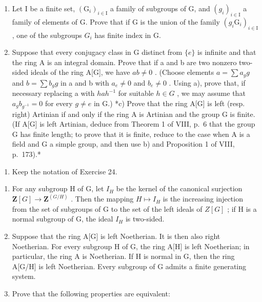 \begin{enumerate}
\def\labelenumi{\alph{enumi})}
\item
  Let I be a finite set, \((\mathrm{G}_{i})_{i\in\mathrm{I}}\) a family of subgroups of G, and \((g_{i})_{i\in\mathrm{I}}\) a family of elements of G. Prove that if G is the union of the family \((g_{i}\mathrm{G}_{i})_{i\in\mathrm{I}}\) , one of the subgroups \(G_{i}\) has finite index in G.
\item
  Suppose that every conjugacy class in G distinct from \(\{e\}\) is infinite and that the ring A is an integral domain. Prove that if a and b are two nonzero two-sided ideals of the ring A{[}G{]}, we have \(ab \neq 0\) . (Choose elements \(a = \sum a_g g\) and \(b = \sum b_g g\) in a and b with \(a_e \neq 0\) and \(b_e \neq 0\) . Using a), prove that, if necessary replacing a with \(hah^{-1}\) for suitable \(h \in G\) , we may assume that \(a_g b_{g^{-1}} = 0\) for every \(g \neq e\) in G.) *c) Prove that the ring A{[}G{]} is left (resp. right) Artinian if and only if the ring A is Artinian and the group G is finite. (If A{[}G{]} is left Artinian, deduce from Theorem 1 of VIII, p.~6 that the group G has finite length; to prove that it is finite, reduce to the case when A is a field and G a simple group, and then use b) and Proposition 1 of VIII, p.~173).*
\end{enumerate}

\begin{enumerate}
\def\labelenumi{\arabic{enumi})}
\setcounter{enumi}{24}
\tightlist
\item
  Keep the notation of Exercise 24.
\end{enumerate}

\begin{enumerate}
\def\labelenumi{\alph{enumi})}
\item
  For any subgroup H of G, let \(I_{H}\) be the kernel of the canonical surjection \(\mathbf{Z}[G] \to \mathbf{Z}^{(G/H)}\) . Then the mapping \(H \mapsto I_{H}\) is the increasing injection from the set of subgroups of G to the set of the left ideals of \(Z[G]\) ; if H is a normal subgroup of G, the ideal \(I_{H}\) is two-sided.
\item
  Suppose that the ring A{[}G{]} is left Noetherian. It is then also right Noetherian. For every subgroup H of G, the ring A{[}H{]} is left Noetherian; in particular, the ring A is Noetherian. If H is normal in G, then the ring A{[}G/H{]} is left Noetherian. Every subgroup of G admits a finite generating system.
\item
  Prove that the following properties are equivalent:
\end{enumerate}


